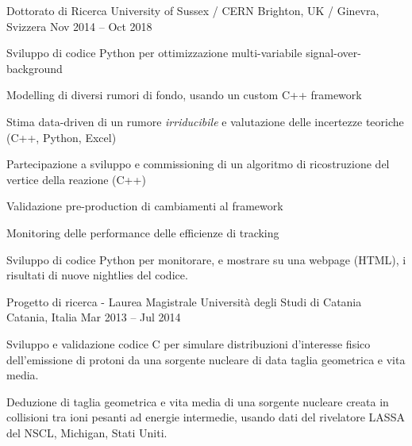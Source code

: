   \begin{cventries}    
    \cventry
    {Dottorato di Ricerca}
    {University of Sussex / CERN}
    {Brighton, UK / Ginevra, Svizzera}
    {Nov 2014 -- Oct 2018}
    {
    \begin{cvitems}
      \item Sviluppo di codice Python per ottimizzazione multi-variabile signal-over-background 
      \item Modelling di diversi rumori di fondo, usando un custom C++ framework
      \item Stima data-driven di un rumore \emph{irriducibile} e valutazione delle incertezze teoriche (C++, Python, Excel)
      \item Partecipazione a sviluppo e commissioning di un algoritmo di ricostruzione del vertice della reazione (C++)
      \item Validazione pre-production di cambiamenti al framework
      \item Monitoring delle performance delle efficienze di tracking
      \item Sviluppo di codice Python per monitorare, e mostrare su una webpage (HTML), i risultati di nuove nightlies del codice.
    \end{cvitems}
    }
  \end{cventries}

  \begin{cventries}    
    \cventry
    {Progetto di ricerca - Laurea Magistrale}
    {Università degli Studi di Catania}
    {Catania, Italia}
    {Mar 2013 -- Jul 2014}
    {
    \begin{cvitems}
      \item Sviluppo e validazione codice C per simulare distribuzioni d'interesse fisico dell'emissione di protoni da una sorgente nucleare di data taglia geometrica e vita media. 
      \item Deduzione di taglia geometrica e vita media di una sorgente nucleare creata in collisioni tra ioni pesanti ad energie intermedie, usando dati del rivelatore LASSA del NSCL, Michigan, Stati Uniti.
    \end{cvitems}
    }
  \end{cventries}